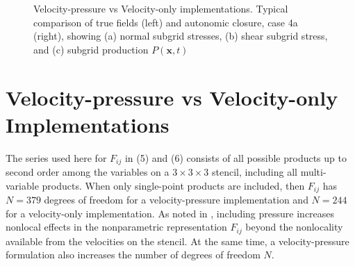 %
\begin{figure}
	\centering %
	\label{F:CL28a}
\end{figure}
%
\begin{figure}
	\ContinuedFloat
	\centering %
	\label{F:CL28b}
\end{figure}
%
\begin{figure}
	\ContinuedFloat
	\centering %
	\label{F:CL28c}
\end{figure}
%
\begin{figure}
	\ContinuedFloat
	\caption{Velocity-pressure vs Velocity-only implementations. Typical comparison of  true fields (left) and autonomic closure, case 4a (right), showing (a) normal subgrid stresses, (b) shear subgrid stress, and (c) subgrid production $P(\mathbf{x},t)$}
	\label{F:CL28}
\end{figure}
%
%


\section{Velocity-pressure vs Velocity-only Implementations}
\label{sec:IVC}

The  series used here for $F_{ij}$  in (5) and (6) consists of all possible products up to second order among the variables on a  $3 \times 3 \times 3$ stencil, including all multi-variable products. When only single-point products are included, then $F_{ij}$  has $N = 379$ degrees of freedom for a velocity-pressure implementation and $N = 244$ for a velocity-only implementation. As noted in , including pressure increases nonlocal effects in the nonparametric representation $F_{ij}$  beyond the nonlocality available from the velocities on the stencil. At the same time, a velocity-pressure formulation also increases the number of degrees of freedom $N$. 


